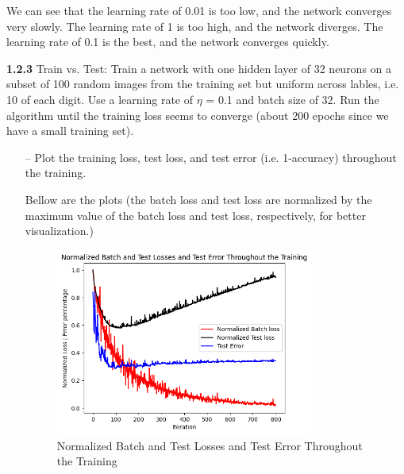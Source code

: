 \documentclass[a4paper, 12pt]{article}
\begin{document}
We can see that the learning rate of 0.01 is too low, and the network converges very slowly.
The learning rate of 1 is too high, and the network diverges.
The learning rate of 0.1 is the best, and the network converges quickly.


\bigskip
\textcolor{myblue}{
\textbf{1.2.3} Train vs. Test: Train a network with one hidden layer of 32 neurons on a subset of 100 random
images from the training set but uniform across lables, i.e. 10 of each digit. Use a learning
rate of $\eta$ = 0.1 and batch size of 32. Run the algorithm until the training loss seems to converge
(about 200 epochs since we have a small training set). 
}

\begin{itemize}
    \item[--] \textcolor{myblue}{Plot the training loss, test loss, and test error (i.e. 1-accuracy) throughout the training.}
    
    \item[] Bellow are the plots (the batch loss and test loss are normalized by the maximum value of the batch loss and test loss, respectively, for better visualization.)
    
    \begin{figure}[H]
        \centering
        \includegraphics[width=0.8\textwidth]{../figs/1-2-3--1.png}
        \caption{Normalized Batch and Test Losses and Test Error Throughout the Training}
        \label{fig:scenario1}
    \end{figure}


\end{itemize}
\end{document}
